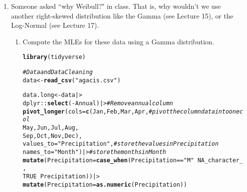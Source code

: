 \documentclass{article}\usepackage[]{graphicx}\usepackage[]{xcolor}
\makeatletter
\newcommand{\hlnum}[1]{\textcolor[rgb]{0.686,0.059,0.569}{#1}}%
\newcommand{\hlsng}[1]{\textcolor[rgb]{0.192,0.494,0.8}{#1}}%
\newcommand{\hlcom}[1]{\textcolor[rgb]{0.678,0.584,0.686}{\textit{#1}}}%
\newcommand{\hlopt}[1]{\textcolor[rgb]{0,0,0}{#1}}%
\newcommand{\hldef}[1]{\textcolor[rgb]{0.345,0.345,0.345}{#1}}%
\newcommand{\hlkwb}[1]{\textcolor[rgb]{0.69,0.353,0.396}{#1}}%
\newcommand{\hlkwc}[1]{\textcolor[rgb]{0.333,0.667,0.333}{#1}}%
\newcommand{\hlkwd}[1]{\textcolor[rgb]{0.737,0.353,0.396}{\textbf{#1}}}%
\newenvironment{kframe}{%
 \def\at@end@of@kframe{}%
 \ifinner\ifhmode%
  \def\at@end@of@kframe{\end{minipage}}%
  \begin{minipage}{\columnwidth}%
 \fi\fi%
 \def\FrameCommand##1{\hskip\@totalleftmargin \hskip-\fboxsep
 \colorbox{shadecolor}{##1}\hskip-\fboxsep
     \hskip-\linewidth \hskip-\@totalleftmargin \hskip\columnwidth}%
 \MakeFramed {\advance\hsize-\width
   \@totalleftmargin\z@ \linewidth\hsize
   \@setminipage}}%
 {\par\unskip\endMakeFramed%
 \at@end@of@kframe}
\newenvironment{knitrout}{}{} %
\makeatother
\begin{document}
\begin{enumerate}
  \item Someone asked ``why Weibull?" in class. That is, why wouldn't we use 
  another right-skewed distribution like the Gamma (see Lecture 15), or
  the Log-Normal (see Lecture 17).
  \begin{enumerate}
    \item Compute the MLEs for these data using a Gamma distribution.
\begin{knitrout}
\color{fgcolor}\begin{kframe}
\begin{alltt}
    \hlkwd{library}\hldef{(tidyverse)}

\hlcom{#Data and Data Cleaning}
\hldef{data} \hlkwb{<-} \hlkwd{read_csv}\hldef{(}\hlsng{"agacis.csv"}\hldef{)}
\end{alltt}


{\ttfamily\noindent\itshape{}}\begin{alltt}
\hldef{data.long} \hlkwb{<-} \hldef{data |>}
  \hldef{dplyr}\hlopt{::}\hlkwd{select}\hldef{(}\hlopt{-}\hldef{Annual) |>}                   \hlcom{# Remove annual column }
  \hlkwd{pivot_longer}\hldef{(}\hlkwc{cols} \hldef{=} \hlkwd{c}\hldef{(Jan, Feb, Mar, Apr,}   \hlcom{# pivot the column data into one col}
                        \hldef{May, Jun, Jul, Aug,}
                        \hldef{Sep, Oct, Nov, Dec),}
               \hlkwc{values_to} \hldef{=} \hlsng{"Precipitation"}\hldef{,}   \hlcom{# store the values in Precipitation}
               \hlkwc{names_to} \hldef{=} \hlsng{"Month"}\hldef{) |>}         \hlcom{# store the months in Month}
  \hlkwd{mutate}\hldef{(}\hlkwc{Precipitation} \hldef{=} \hlkwd{case_when}\hldef{(Precipitation} \hlopt{==} \hlsng{"M"} \hlopt{~} \hlnum{NA_character_}\hldef{,}
                                   \hlnum{TRUE}                 \hlopt{~} \hldef{Precipitation))|>}
  \hlkwd{mutate}\hldef{(}\hlkwc{Precipitation} \hldef{=} \hlkwd{as.numeric}\hldef{(Precipitation))}


\end{alltt}
\end{kframe}
\end{knitrout}
\end{enumerate}
\end{enumerate}
\end{document}
